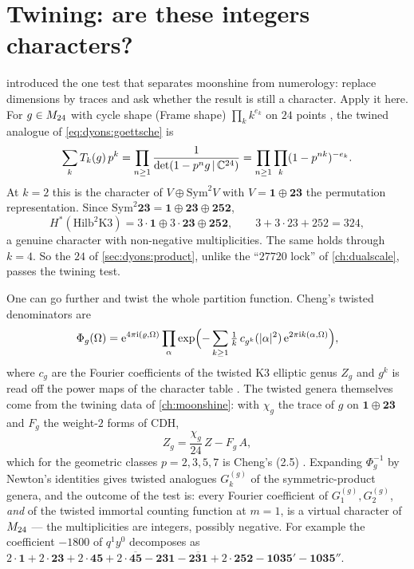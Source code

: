 \section{Twining: are these integers characters?}\label{sec:dyons:twining}

 introduced the one test that separates moonshine from numerology:
replace dimensions by traces and ask whether the result is still a character. Apply it here.
For $g\in M_{24}$ with cycle shape (Frame shape) $\prod_k k^{e_k}$ on $24$ points
, the twined analogue of \eqref{eq:dyons:goettsche} is
\begin{equation}\label{eq:dyons:twinedgoettsche}
  \sum_k T_k(g)\,p^k=\prod_{n\ge1}\frac{1}{\det(1-p^ng\,|\,\mathbb{C}^{24})}
  =\prod_{n\ge1}\prod_k(1-p^{nk})^{-e_k}.
\end{equation}
At $k=2$ this is the character of $V\oplus\mathrm{Sym}^2V$ with $V=\mathbf{1}\oplus\mathbf{23}$
the permutation representation. Since $\mathrm{Sym}^2\mathbf{23}=\mathbf{1}\oplus\mathbf{23}
\oplus\mathbf{252}$,
\begin{equation}\label{eq:dyons:hilb2}
  H^*(\mathrm{Hilb}^2\mathrm{K3})=3\cdot\mathbf{1}\oplus3\cdot\mathbf{23}\oplus\mathbf{252},
  \qquad 3+3\cdot23+252=324 ,
\end{equation}
a genuine character with non-negative multiplicities. The same holds through $k=4$. So the
$24$ of \cref{sec:dyons:product}, unlike the ``$27720$ lock'' of \cref{ch:dualscale}, passes
the twining test.

One can go further and twist the whole partition function. Cheng's twisted denominators
 are
\begin{equation}\label{eq:dyons:twisted}
  \Phi_g(\Omega)=\mathrm{e}^{4\pi\mathrm{i}(\varrho,\Omega)}\prod_{\alpha}
  \exp\Bigl(-\sum_{k\ge1}\tfrac1k\,c_{g^k}(|\alpha|^2)\,\mathrm{e}^{2\pi\mathrm{i} k(\alpha,\Omega)}\Bigr),
\end{equation}
where $c_{g}$ are the Fourier coefficients of the twisted K3 elliptic genus $Z_g$ and $g^k$ is
read off the power maps of the character table . The
twisted genera themselves come from the twining data of \cref{ch:moonshine}: with $\chi_g$ the
trace of $g$ on $\mathbf{1}\oplus\mathbf{23}$  and $F_g$ the
weight-$2$ forms of CDH,
\begin{equation}\label{eq:dyons:Zg}
  Z_g=\frac{\chi_g}{24}\,Z-F_g\,A ,
\end{equation}
which for the geometric classes $p=2,3,5,7$ is Cheng's (2.5) .
Expanding $\Phi_g^{-1}$ by Newton's identities gives twisted analogues $G^{(g)}_k$ of the
symmetric-product genera, and the outcome of the test is: every Fourier coefficient of
$G^{(g)}_1,G^{(g)}_2$, \emph{and} of the twisted immortal counting function at $m=1$, is a
virtual character of $M_{24}$ --- the multiplicities are integers, possibly negative. For
example the coefficient $-1800$ of $q^1y^0$ decomposes as
$2\cdot\mathbf{1}+2\cdot\mathbf{23}+2\cdot\mathbf{45}+2\cdot\overline{\mathbf{45}}
-\mathbf{231}-\overline{\mathbf{231}}+2\cdot\mathbf{252}-\mathbf{1035}'-\mathbf{1035}''$.

